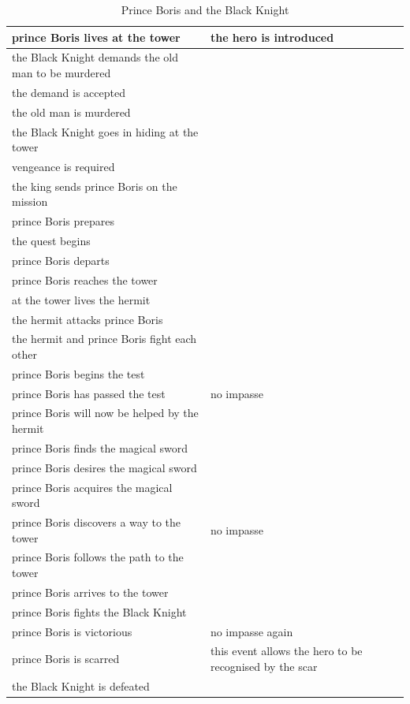 \documentclass[12pt,a4paper,oneside]{report}
\begin{document}
\begin{longtable}[H]{| p{} | p{} |}
	\caption {Prince Boris and the Black Knight}\\
\hline
prince Boris lives at the tower & the hero is introduced\\
\hline
the Black Knight demands the old man to be murdered & \\
\hline
the demand is accepted & \\
\hline
the old man is murdered & \\
\hline
the Black Knight goes in hiding at the tower & \\
\hline
vengeance is required & \\
\hline
the king sends prince Boris on the mission & \\
\hline
prince Boris prepares & \\
\hline
the quest begins&  \\
\hline
prince Boris departs & \\
\hline
prince Boris reaches the tower & \\
\hline
at the tower lives the hermit & \\
\hline
the hermit attacks prince Boris & \\
\hline
the hermit and prince Boris fight each other & \\
\hline
prince Boris begins the test & \\
\hline
prince Boris has passed the test & no impasse\\
\hline
prince Boris will now be helped by the hermit & \\
\hline
prince Boris finds the magical sword & \\
\hline
prince Boris desires the magical sword & \\
\hline
prince Boris acquires the magical sword & \\
\hline
prince Boris discovers a way to the tower & no impasse\\
\hline
prince Boris follows the path to the tower & \\
\hline
prince Boris arrives to the tower & \\
\hline
prince Boris fights the Black Knight & \\
\hline
prince Boris is victorious & no impasse again\\
\hline
prince Boris is scarred & this event allows the hero to be recognised by the scar\\
\hline
the Black Knight is defeated & \\

\end{longtable}
\end{document}
